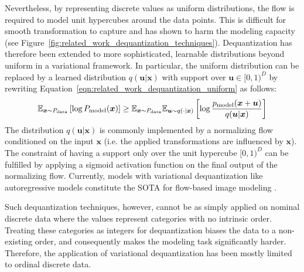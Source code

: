 Nevertheless, by representing discrete values as uniform distributions, the flow is required to model unit hypercubes around the data points. This is difficult for smooth transformation to capture and has shown to harm the modeling capacity \cite{EmielDequantization} (see Figure~\ref{fig:related_work_dequantization_techniques}). Dequantization has therefore been extended to more sophisticated, learnable distributions beyond uniform in a variational framework. In particular, the uniform distribution can be replaced by a learned distribution $q(\bm{u}|\bm{x})$ with support over $\bm{u}\in[0,1)^D$ by rewriting Equation~\ref{eqn:related_work_dequantization_uniform} as follows:
\begin{equation}
    \label{eqn:related_work_dequantization_variational}
    \mathbb{E}_{\bm{x}\sim P_{\text{data}}}\left[\log P_{\text{model}}(\bm{x})\right] \geq \mathbb{E}_{\bm{x}\sim P_{\text{data}}}\mathbb{E}_{\bm{u}\sim q(\cdot|\bm{x})}\left[\log \frac{p_{\text{model}}(\bm{x}+\bm{u})}{q(\bm{u}|\bm{x})}\right]
\end{equation}
The distribution $q(\bm{u}|\bm{x})$ is commonly implemented by a normalizing flow conditioned on the input $\bm{x}$ (i.e. the applied transformations are influenced by $\bm{x}$). 
The constraint of having a support only over the unit hypercube $[0,1)^D$ can be fulfilled by applying a sigmoid activation function on the final output of the normalizing flow. 
Currently, models with variational dequantization like autoregressive models constitute the \acl{SOTA} for flow-based image modeling \cite{VFlow, EmielDequantization}. 

Such dequantization techniques, however, cannot be as simply applied on nominal discrete data where the values represent categories with no intrinsic order. 
Treating these categories as integers for dequantization biases the data to a non-existing order, and consequently makes the modeling task significantly harder.
Therefore, the application of variational dequantization has been mostly limited to ordinal discrete data.

